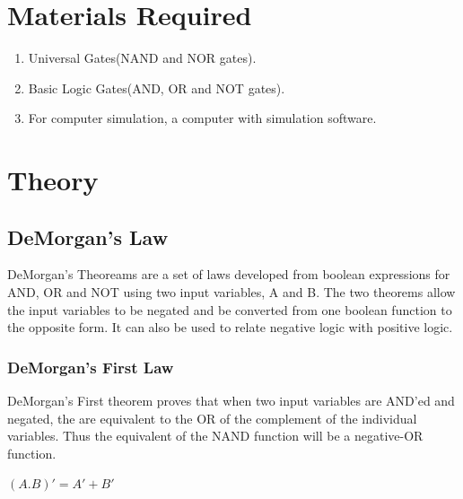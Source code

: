 \documentclass[a4paper, 12pt]{article}
\begin{document}
\section{Materials Required}
\begin{enumerate}
  \item
    Universal Gates(NAND and NOR gates).
  \item
    Basic Logic Gates(AND, OR and NOT gates).
  \item
    For computer simulation, a computer with simulation software.
\end{enumerate}

\pagebreak
\section{Theory}
\subsection{DeMorgan's Law}
DeMorgan's Theoreams are a set of laws developed from boolean expressions for AND, OR and NOT using two input variables, A and B. The two theorems allow the input variables to be negated and be converted from one boolean function to the opposite form. It can also be used to relate negative logic with positive logic.

\subsubsection{DeMorgan's First Law}
DeMorgan's First theorem proves that when two input variables are AND'ed and negated, the are equivalent to the OR of the complement of the individual variables. Thus the equivalent of the NAND function will be a negative-OR function.

\begin{center}
  $(A . B)' = A' + B'$
\end{center} 
\end{document}
